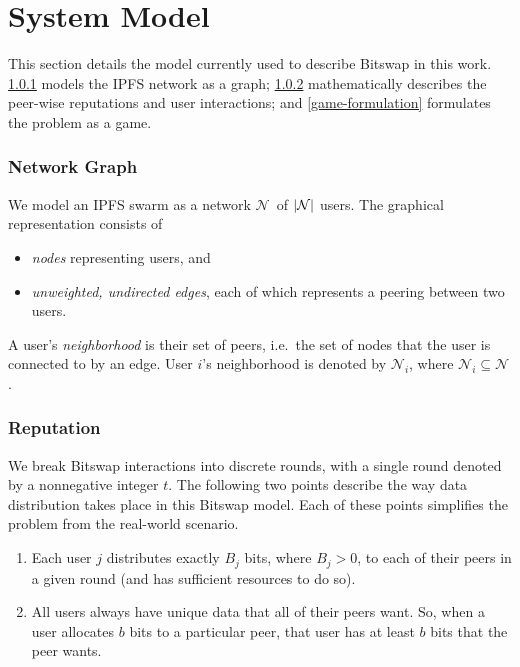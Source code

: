 \documentclass[12pt,letterpaper,]{article}
\providecommand{\tightlist}{%
  \setlength{\itemsep}{0pt}\setlength{\parskip}{0pt}}
\DeclarePairedDelimiter\abs{\lvert}{\rvert}
\newcommand{\Network}{\ensuremath{\mathcal{N}}}
\newcommand{\Nbhd}[1]{\ensuremath{\mathcal{N}_{#1}}}
\begin{document}
\hypertarget{system-model}{%
\chapter{System Model}\label{system-model}}

This section details the model currently used to describe Bitswap in
this work. \cref{network-graph} models the IPFS network as a graph;
\cref{reputation} mathematically describes the peer-wise reputations and
user interactions; and \cref{game-formulation} formulates the problem as
a game.

\hypertarget{network-graph}{%
\subsection{Network Graph}\label{network-graph}}

We model an IPFS swarm as a network \Network~of \(\abs{\Network}\)
users. The graphical representation consists of

\begin{itemize}
\tightlist
\item
  \emph{nodes} representing users, and
\item
  \emph{unweighted, undirected edges}, each of which represents a
  peering between two users.
\end{itemize}

A user's \emph{neighborhood} is their set of peers, i.e.~the set of
nodes that the user is connected to by an edge. User \(i\)'s
neighborhood is denoted by \(\Nbhd{i}\), where
\(\Nbhd{i} \subseteq \Network\).

\hypertarget{reputation}{%
\subsection{Reputation}\label{reputation}}

We break Bitswap interactions into discrete rounds, with a single round
denoted by a nonnegative integer \(t\). The following two points
describe the way data distribution takes place in this Bitswap model.
Each of these points simplifies the problem from the real-world
scenario.

\begin{enumerate}
\def\labelenumi{\arabic{enumi}.}
\tightlist
\item
  Each user \(j\) distributes exactly \(B_j\) bits, where \(B_j > 0\),
  to each of their peers in a given round (and has sufficient resources
  to do so).
\item
  All users always have unique data that all of their peers want. So,
  when a user allocates \(b\) bits to a particular peer, that user has
  at least \(b\) bits that the peer wants.
\end{enumerate}
\end{document}
